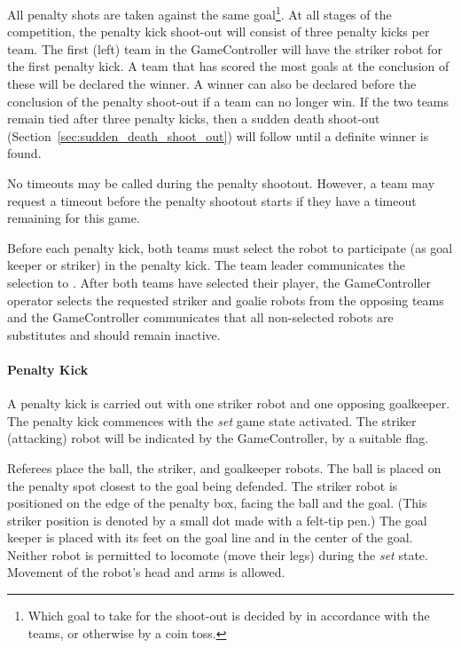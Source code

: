 All penalty shots are taken against the same goal\footnote{Which goal to take for the shoot-out is decided by in accordance with the teams, or otherwise by a coin toss.}.
At all stages of the competition, the penalty kick shoot-out will consist of three penalty kicks per team. The first (left) team in the GameController will have the striker robot for the first penalty kick. A team that has scored the most goals at the conclusion of these will be declared the winner. A winner can also be declared before the conclusion of the penalty shoot-out if a team can no longer win. If the two teams remain tied after three penalty kicks, then a sudden death shoot-out (\cf Section~\ref{sec:sudden_death_shoot_out}) will follow until a definite winner is found.

No timeouts may be called during the penalty shootout. However, a team may request a timeout before the penalty shootout starts if they have a timeout remaining for this game.

Before each penalty kick, both teams must select the robot to participate (as goal keeper or striker) in the penalty kick. The team leader communicates the selection to . After both teams have selected their player, the GameController operator selects the requested striker and goalie robots from the opposing teams and the GameController communicates that all non-selected robots are substitutes and should remain inactive.

\paragraph{Penalty Kick}
\label{sec:penalty_kick}

A penalty kick is carried out with one striker robot and one opposing goalkeeper. The penalty kick commences with the \textit{set} game state activated. The striker (attacking) robot will be indicated by the GameController, by a suitable flag.

Referees place the ball, the striker, and goalkeeper robots. The ball is placed on the penalty spot closest to the goal being defended. The striker robot is positioned on the edge of the penalty box, facing the ball and the goal. (This striker position is denoted by a small dot made with a felt-tip pen.) The goal keeper is placed with its feet on the goal line and in the center of the goal.
Neither robot is permitted to locomote (move their legs) during the \textit{set} state. Movement of the robot's head and arms is allowed.

